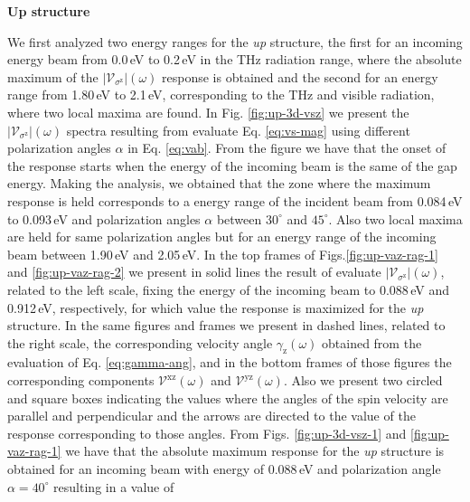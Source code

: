 \documentclass[prb,11pt,tightenlines,twocolumn,aps]{revtex4-1}
\begin{document}
\textbf{Up structure}

We first analyzed two energy ranges for the \emph{up} structure, the first for
an incoming energy beam from 0.0\,eV to 0.2\,eV in the THz radiation range,
where the absolute maximum of the $|\mathcal{V}_{\sigma^{\mathrm{z}}}|(\omega)$
response is obtained and the second for an energy range from 1.80\,eV to
2.1\,eV, corresponding to the THz and visible radiation, where two local maxima
are found.
% 
In Fig. \ref{fig:up-3d-vsz} we present the
$|\mathcal{V}_{\sigma^{\mathrm{z}}}|(\omega)$ spectra resulting from evaluate
Eq. \eqref{eq:vs-mag} using different polarization angles $\alpha$ in Eq.
\eqref{eq:vab}. From the figure we have that the onset of the response starts
when the energy of the incoming beam is the same of the gap energy.
% 
Making the analysis, we obtained that the zone where the maximum response is
held corresponds to a energy range of the incident beam from 0.084\,eV to
0.093\,eV and polarization angles $\alpha$ between $30^{\circ}$ and
$45^{\circ}$. Also two local maxima are held for same polarization angles but
for an energy range of the incoming beam between 1.90\,eV and 2.05\,eV.
In the top frames of Figs.\ref{fig:up-vaz-rag-1} and \ref{fig:up-vaz-rag-2} we
present in solid lines the result of evaluate
$|\mathcal{V}_{\sigma^{\mathrm{z}}}|(\omega)$, related to the left scale, fixing
the energy of the incoming beam to 0.088\,eV and 0.912\,eV, respectively, for
which value the response is maximized for the \emph{up} structure. In the same
figures and frames we present in dashed lines, related to the right scale, the
corresponding velocity angle $\gamma_{\mathrm{z}}(\omega)$ obtained from the
evaluation of Eq. \eqref{eq:gamma-ang}, and in the bottom frames of those
figures the corresponding components $\mathcal{V}^{\mathrm{xz}}(\omega)$ and
$\mathcal{V}^{\mathrm{yz}}(\omega)$. Also we present two circled and square
boxes indicating the values where the angles of the spin velocity are parallel
and perpendicular and the arrows are directed to the value of the response
corresponding to those angles.
% 
From Figs. \ref{fig:up-3d-vsz-1} and \ref{fig:up-vaz-rag-1} we have that the
absolute maximum response for the \emph{up} structure is obtained for an
incoming beam with energy of 0.088\,eV and polarization angle
$\alpha=40^{\circ}$ resulting in a value of
\end{document}
